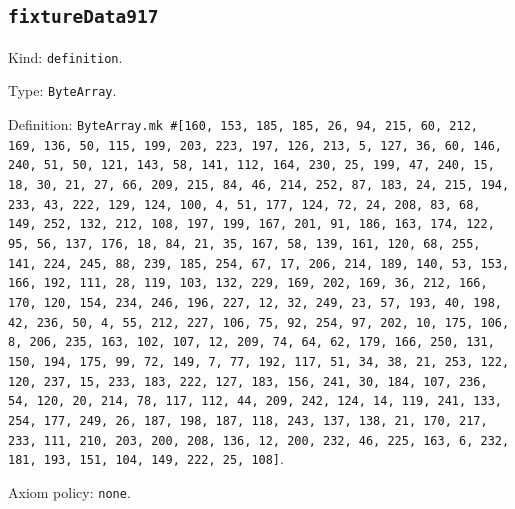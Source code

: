 \documentclass[11pt]{article}
\begin{document}
\subsection*{\texttt{fixtureData917}}
\noindent Kind: \texttt{definition}.\par
\noindent Type: \texttt{ByteArray}.\par
\noindent Definition: \texttt{ByteArray.mk \#[160, 153, 185, 185, 26, 94, 215, 60, 212, 169, 136, 50, 115, 199, 203, 223, 197, 126, 213, 5, 127, 36, 60, 146, 240, 51, 50, 121, 143, 58, 141, 112, 164, 230, 25, 199, 47, 240, 15, 18, 30, 21, 27, 66, 209, 215, 84, 46, 214, 252, 87, 183, 24, 215, 194, 233, 43, 222, 129, 124, 100, 4, 51, 177, 124, 72, 24, 208, 83, 68, 149, 252, 132, 212, 108, 197, 199, 167, 201, 91, 186, 163, 174, 122, 95, 56, 137, 176, 18, 84, 21, 35, 167, 58, 139, 161, 120, 68, 255, 141, 224, 245, 88, 239, 185, 254, 67, 17, 206, 214, 189, 140, 53, 153, 166, 192, 111, 28, 119, 103, 132, 229, 169, 202, 169, 36, 212, 166, 170, 120, 154, 234, 246, 196, 227, 12, 32, 249, 23, 57, 193, 40, 198, 42, 236, 50, 4, 55, 212, 227, 106, 75, 92, 254, 97, 202, 10, 175, 106, 8, 206, 235, 163, 102, 107, 12, 209, 74, 64, 62, 179, 166, 250, 131, 150, 194, 175, 99, 72, 149, 7, 77, 192, 117, 51, 34, 38, 21, 253, 122, 120, 237, 15, 233, 183, 222, 127, 183, 156, 241, 30, 184, 107, 236, 54, 120, 20, 214, 78, 117, 112, 44, 209, 242, 124, 14, 119, 241, 133, 254, 177, 249, 26, 187, 198, 187, 118, 243, 137, 138, 21, 170, 217, 233, 111, 210, 203, 200, 208, 136, 12, 200, 232, 46, 225, 163, 6, 232, 181, 193, 151, 104, 149, 222, 25, 108]}.\par
\noindent Axiom policy: \texttt{none}.\par
\end{document}
